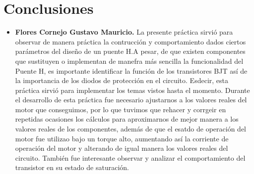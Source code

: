 \documentclass[journal]{IEEEtran}
\begin{document}
\section{Conclusiones}
\begin{itemize}
    \item \textbf{Flores Cornejo Gustavo Mauricio.}
    \newline 
    La presente práctica sirvió para observar de manera práctica la contrucción y comportamiento dados ciertos parámetros del diseño de un puente H.A pesar, de que existen componentes que sustituyen
    o implementan de manefra más sencilla la funcionalidad del Puente H, es importante identificar la función de los transistores BJT así de la importancia de los diodos de protección en el circuito.
    Esdecir, esta práctica sirvió para implementar los temas vistos hasta el momento. Durante el desarrollo de esta práctica fue necesario ajustarnos a los valores reales del motor que conseguimos, por lo que
    tuvimos que rehacer y corrgeir en repetidas ocasiones los cálculos para aproximarnos de mejor manera a los valores reales de los componentes, además de que el esatdo de operación del motor fue utilizao bajo
    un torque alto, aumentando así la corriente de operación del motor y alterando de igual manera los valores reales del circuito.
    También fue interesante observar y analizar el comportamiento del transistor en su estado de saturación.
    \newline 


\end{itemize}
\end{document}
